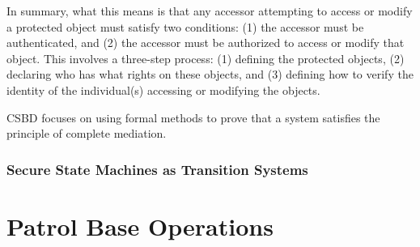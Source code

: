 \documentclass[../../main/main.tex]{subfiles}
\begin{document}
In summary, what this means is that any accessor attempting to access or modify a protected object must satisfy two conditions: (1) the accessor must be authenticated, and (2) the accessor must be authorized to access or modify that object.  This involves a three-step process: (1) defining the protected objects, (2) declaring who has what rights on these objects, and (3) defining how to verify the identity of the individual(s) accessing or modifying the objects.  

CSBD focuses on using formal methods to prove that a system satisfies the principle of complete mediation.

\subsubsection{Secure State Machines as Transition Systems }\label{sssect:ssmts}

\section{Patrol Base Operations}\label{sec:stormpb}
\end{document}
